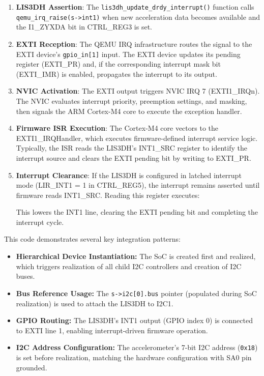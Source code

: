 \begin{enumerate}
\item \textbf{LIS3DH Assertion}: The \texttt{lis3dh\_update\_drdy\_interrupt()} function calls \texttt{qemu\_irq\_raise(s->int1)} when new acceleration data becomes available and the I1\_ZYXDA bit in CTRL\_REG3 is set.

\item \textbf{EXTI Reception}: The QEMU IRQ infrastructure routes the signal to the EXTI device's \texttt{gpio\_in[1]} input. The EXTI device updates its pending register (EXTI\_PR) and, if the corresponding interrupt mask bit (EXTI\_IMR) is enabled, propagates the interrupt to its output.

\item \textbf{NVIC Activation}: The EXTI output triggers NVIC IRQ 7 (EXTI1\_IRQn). The NVIC evaluates interrupt priority, preemption settings, and masking, then signals the ARM Cortex-M4 core to execute the exception handler.

\item \textbf{Firmware ISR Execution}: The Cortex-M4 core vectors to the EXTI1\_IRQHandler, which executes firmware-defined interrupt service logic. Typically, the ISR reads the LIS3DH's INT1\_SRC register to identify the interrupt source and clears the EXTI pending bit by writing to EXTI\_PR.

\item \textbf{Interrupt Clearance}: If the LIS3DH is configured in latched interrupt mode (LIR\_INT1 = 1 in CTRL\_REG5), the interrupt remains asserted until firmware reads INT1\_SRC. Reading this register executes:


This lowers the INT1 line, clearing the EXTI pending bit and completing the interrupt cycle.
\end{enumerate}





This code demonstrates several key integration patterns:

\begin{itemize}
\item \textbf{Hierarchical Device Instantiation:} The SoC is created first and realized, which triggers realization of all child I2C controllers and creation of I2C buses.

\item \textbf{Bus Reference Usage:} The \texttt{s->i2c[0].bus} pointer (populated during SoC realization) is used to attach the LIS3DH to I2C1.

\item \textbf{GPIO Routing:} The LIS3DH's INT1 output (GPIO index 0) is connected to EXTI line 1, enabling interrupt-driven firmware operation.

\item \textbf{I2C Address Configuration:} The accelerometer's 7-bit I2C address (\texttt{0x18}) is set before realization, matching the hardware configuration with SA0 pin grounded.
\end{itemize}

